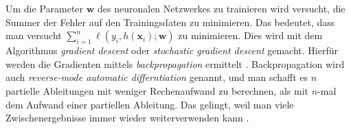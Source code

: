 Um die Parameter $\mathbf{w}$ des neuronalen Netzwerkes zu trainieren wird versucht, die Summer der Fehler auf den Trainingsdaten zu minimieren. Das bedeutet, dass
man versucht $\sum_{i=1}^n \ell(y_i, h(\mathbf{x}_i); \mathbf{w})$ zu minimieren. Dies wird mit dem Algorithmus \textit{gradient descent} oder \textit{stochastic gradient descent}
gemacht. Hierf\"ur werden die Gradienten mittels \textit{backpropagation} ermittelt \cite{werbos}. Backpropagation wird auch \textit{reverse-mode automatic differntiation} genannt, und man
schafft es $n$ partielle Ableitungen mit weniger Rechenaufwand zu berechnen, als mit $n$-mal dem Aufwand einer partiellen Ableitung. Das gelingt, weil man viele
Zwischenergebnisse immer wieder weiterverwenden kann \cite[Kaptitel 7.3]{strang}.